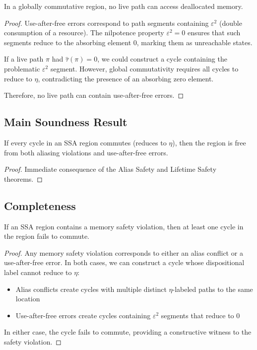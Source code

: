 \documentclass[journal]{IEEEtran}
\begin{document}
\begin{theorem}  
In a globally commutative region, no live path can access deallocated memory.
\end{theorem}

\begin{proof}
Use-after-free errors correspond to path segments containing $\varepsilon^2$ (double consumption of a resource). The nilpotence property $\varepsilon^2 = 0$ ensures that such segments reduce to the absorbing element 0, marking them as unreachable states.

If a live path $\pi$ had $\hat{\tau}(\pi) = 0$, we could construct a cycle containing the problematic $\varepsilon^2$ segment. However, global commutativity requires all cycles to reduce to $\eta$, contradicting the presence of an absorbing zero element.

Therefore, no live path can contain use-after-free errors.
\end{proof}

\subsection{Main Soundness Result}

\begin{theorem}[Soundness]
If every cycle in an SSA region commutes (reduces to $\eta$), then the region is free from both aliasing violations and use-after-free errors.
\end{theorem}

\begin{proof}
Immediate consequence of the Alias Safety and Lifetime Safety theorems.
\end{proof}

\subsection{Completeness}

\begin{theorem}[Completeness]
If an SSA region contains a memory safety violation, then at least one cycle in the region fails to commute.
\end{theorem}

\begin{proof}
Any memory safety violation corresponds to either an alias conflict or a use-after-free error. In both cases, we can construct a cycle whose dispositional label cannot reduce to $\eta$:

\begin{itemize}
\item Alias conflicts create cycles with multiple distinct $\eta$-labeled paths to the same location
\item Use-after-free errors create cycles containing $\varepsilon^2$ segments that reduce to 0
\end{itemize}

In either case, the cycle fails to commute, providing a constructive witness to the safety violation.
\end{proof}
\end{document}

